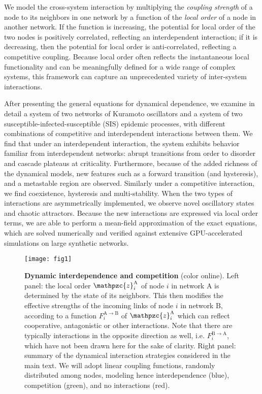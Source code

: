 \documentclass[pre,twocolumn,superscriptaddress]{revtex4}
\newcommand{\1}{\mathds{1}}
\begin{document}
We model the cross-system interaction by multiplying the \textit{coupling strength} of a node  to its neighbors in one network by a function of the \textit{local order} of a node in another network.
If the function is increasing, the potential for local order of the two nodes is positively correlated, reflecting an interdependent interaction; if it is decreasing, then the potential for local order is anti-correlated, reflecting a competitive coupling.
Because local order often reflects the instantaneous local functionality and can be meaningfully defined for a wide range of complex systems, this framework can capture an unprecedented variety of inter-system interactions.


After presenting the general equations for dynamical dependence, we examine in detail a system of two networks of Kuramoto oscillators and a system of two susceptible-infected-susceptible (SIS) epidemic processes, with different combinations of competitive and interdependent interactions between them.
We find that under an interdependent interaction, the system exhibits behavior familiar from interdependent networks: abrupt transitions from order to disorder and cascade plateaus at criticality.
Furthermore, because of the added richness of the dynamical models, new features such as a forward transition (and hysteresis), and a metastable region are observed.
Similarly under a competitive interaction, we find coexistence, hysteresis and multi-stability.
When the two types of interactions are asymmetrically implemented, we observe novel oscillatory states and chaotic attractors.
Because the new interactions are expressed via local order terms, we are able to perform a mean-field approximation of the exact equations, which are solved numerically and verified against extensive GPU-accelerated simulations on large synthetic networks.
\begin{figure*}
    \centering
    \texttt{[image: fig1]}
    \caption{{\bf Dynamic interdependence and competition} (color online). Left panel: the local order $\mathpzc{z}_i^{\mathrm{A}}$ of node $i$ in network $\mathrm{A}$ is determined by the state of its neighbors. This then modifies the effective strengths of the incoming links of node $i$ in network $\mathrm{B}$, according to a function $F_i^{\mathrm{A}\to\mathrm{B}}$ of $\mathpzc{z}_i^\mathrm{A}$ which can reflect cooperative, antagonistic or other interactions. Note that there are typically interactions in the opposite direction as well, i.e. $F_i^{\mathrm{B} \to \mathrm{A}}$, which have not been drawn here for the sake of clarity. Right panel: summary of the dynamical interaction strategies considered in the main text. We will adopt linear coupling functions, randomly distributed among nodes, modeling hence interdependence (blue), competition (green), and no interactions (red).}
    \label{fig:fig1}
\end{figure*}
\end{document}
